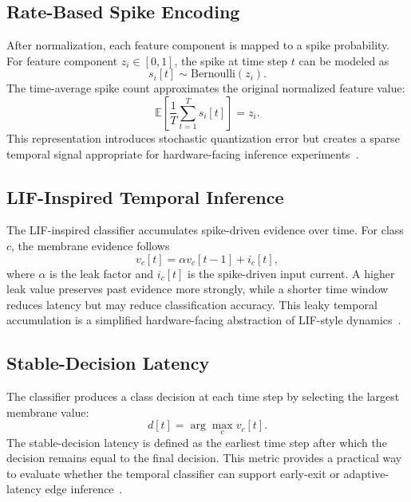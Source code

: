 \documentclass[11pt]{article}
\begin{document}
\subsection{Rate-Based Spike Encoding}

After normalization, each feature component is mapped to a spike probability. For feature component $z_i \in [0,1]$, the spike at time step $t$ can be modeled as
\begin{equation}
    s_i[t] \sim \mathrm{Bernoulli}(z_i).
\end{equation}
The time-average spike count approximates the original normalized feature value:
\begin{equation}
    \mathbb{E}\left[\frac{1}{T}\sum_{t=1}^{T}s_i[t]\right]=z_i.
\end{equation}
This representation introduces stochastic quantization error but creates a sparse temporal signal appropriate for hardware-facing inference experiments~\cite{maass1997networks,roy2019towards}.

\subsection{LIF-Inspired Temporal Inference}

The LIF-inspired classifier accumulates spike-driven evidence over time. For class $c$, the membrane evidence follows
\begin{equation}
    v_c[t]=\alpha v_c[t-1]+i_c[t],
\end{equation}
where $\alpha$ is the leak factor and $i_c[t]$ is the spike-driven input current. A higher leak value preserves past evidence more strongly, while a shorter time window reduces latency but may reduce classification accuracy. This leaky temporal accumulation is a simplified hardware-facing abstraction of LIF-style dynamics~\cite{gerstner2002spiking,roy2019towards}.

\subsection{Stable-Decision Latency}

The classifier produces a class decision at each time step by selecting the largest membrane value:
\begin{equation}
    d[t]=\arg\max_{c}v_c[t].
\end{equation}
The stable-decision latency is defined as the earliest time step after which the decision remains equal to the final decision. This metric provides a practical way to evaluate whether the temporal classifier can support early-exit or adaptive-latency edge inference~\cite{roy2019towards}.
\end{document}
